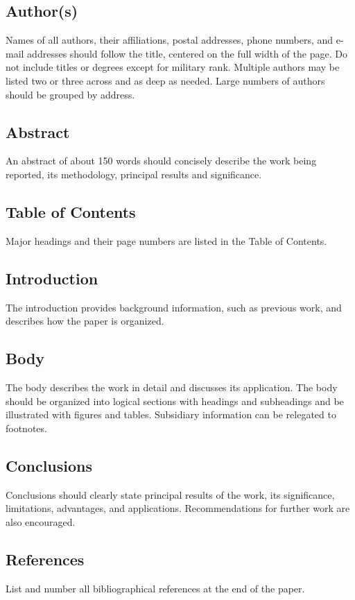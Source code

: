 \documentclass[twocolumn,letterpaper]{IEEEAerospaceCLS}  %
\begin{document}
\subsection{Author(s)}
Names of all authors, their affiliations, postal addresses, phone numbers, and e-mail addresses should follow the title, centered on the full width of the page. Do not include titles or degrees except for military rank. Multiple authors may be listed two or three across and as deep as needed. Large numbers of authors should be grouped by address.

\subsection{Abstract}
An abstract of about 150 words should concisely describe the work being reported, its methodology, principal results and significance.

\subsection{Table of Contents}
Major headings and their page numbers are listed in the Table of Contents.

\subsection{Introduction}
The introduction provides background information, such as previous work, and describes how the paper is organized.

\subsection{Body}
The body describes the work in detail and discusses its application. The body should be organized into logical sections with headings and subheadings and be illustrated with figures and tables. Subsidiary information can be relegated to footnotes.

\subsection{Conclusions}
Conclusions should clearly state principal results of the work, its significance, limitations, advantages, and applications. Recommendations for further work are also encouraged.

\subsection{References}
List and number all bibliographical references at the end of the paper.
\end{document}
